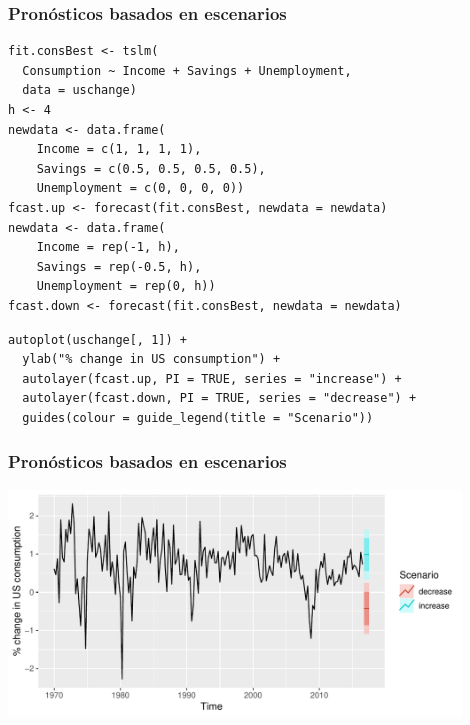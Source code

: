 \documentclass[10pt]{beamer}
\begin{document}




\begin{frame}[fragile]
\frametitle{Pronósticos basados en escenarios}



\lstset{language=r,label= ,caption= ,captionpos=b,numbers=none}
\begin{lstlisting}
fit.consBest <- tslm(
  Consumption ~ Income + Savings + Unemployment,
  data = uschange)
h <- 4
newdata <- data.frame(
    Income = c(1, 1, 1, 1),
    Savings = c(0.5, 0.5, 0.5, 0.5),
    Unemployment = c(0, 0, 0, 0))
fcast.up <- forecast(fit.consBest, newdata = newdata)
newdata <- data.frame(
    Income = rep(-1, h),
    Savings = rep(-0.5, h),
    Unemployment = rep(0, h))
fcast.down <- forecast(fit.consBest, newdata = newdata)
\end{lstlisting}



\lstset{language=r,label= ,caption= ,captionpos=b,numbers=none}
\begin{lstlisting}
autoplot(uschange[, 1]) +
  ylab("% change in US consumption") +
  autolayer(fcast.up, PI = TRUE, series = "increase") +
  autolayer(fcast.down, PI = TRUE, series = "decrease") +
  guides(colour = guide_legend(title = "Scenario"))
\end{lstlisting}


\end{frame}






\begin{frame}[fragile]
\frametitle{Pronósticos basados en escenarios}



\begin{center}
\includegraphics[width=0.9\textwidth]{5-regression_files/figure-beamer/usconsumptionf2-1.pdf}
\end{center} 

\end{frame}
\end{document}
